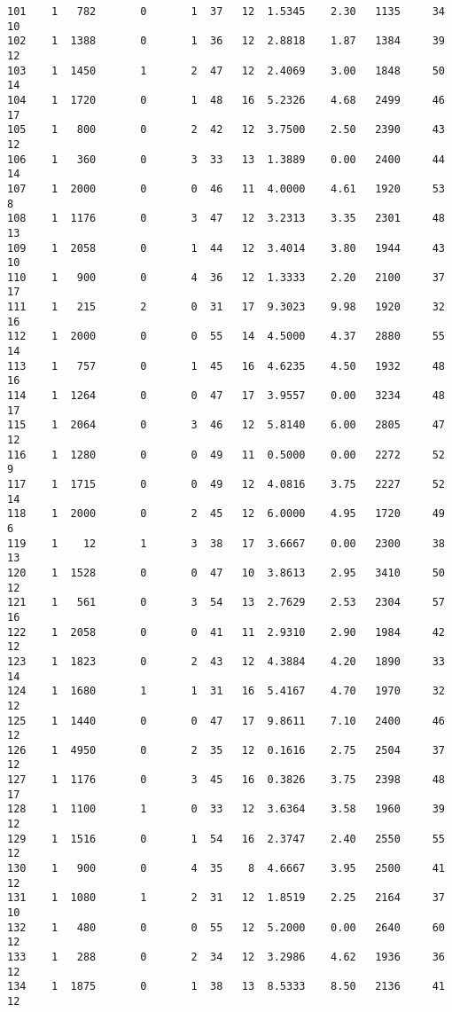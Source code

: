 \documentclass[
  letterpaper,
  DIV=11,
  numbers=noendperiod]{scrreprt}
\begin{document}
\begin{verbatim}
101    1   782       0       1  37   12  1.5345    2.30   1135     34      10
102    1  1388       0       1  36   12  2.8818    1.87   1384     39      12
103    1  1450       1       2  47   12  2.4069    3.00   1848     50      14
104    1  1720       0       1  48   16  5.2326    4.68   2499     46      17
105    1   800       0       2  42   12  3.7500    2.50   2390     43      12
106    1   360       0       3  33   13  1.3889    0.00   2400     44      14
107    1  2000       0       0  46   11  4.0000    4.61   1920     53       8
108    1  1176       0       3  47   12  3.2313    3.35   2301     48      13
109    1  2058       0       1  44   12  3.4014    3.80   1944     43      10
110    1   900       0       4  36   12  1.3333    2.20   2100     37      17
111    1   215       2       0  31   17  9.3023    9.98   1920     32      16
112    1  2000       0       0  55   14  4.5000    4.37   2880     55      14
113    1   757       0       1  45   16  4.6235    4.50   1932     48      16
114    1  1264       0       0  47   17  3.9557    0.00   3234     48      17
115    1  2064       0       3  46   12  5.8140    6.00   2805     47      12
116    1  1280       0       0  49   11  0.5000    0.00   2272     52       9
117    1  1715       0       0  49   12  4.0816    3.75   2227     52      14
118    1  2000       0       2  45   12  6.0000    4.95   1720     49       6
119    1    12       1       3  38   17  3.6667    0.00   2300     38      13
120    1  1528       0       0  47   10  3.8613    2.95   3410     50      12
121    1   561       0       3  54   13  2.7629    2.53   2304     57      16
122    1  2058       0       0  41   11  2.9310    2.90   1984     42      12
123    1  1823       0       2  43   12  4.3884    4.20   1890     33      14
124    1  1680       1       1  31   16  5.4167    4.70   1970     32      12
125    1  1440       0       0  47   17  9.8611    7.10   2400     46      12
126    1  4950       0       2  35   12  0.1616    2.75   2504     37      12
127    1  1176       0       3  45   16  0.3826    3.75   2398     48      17
128    1  1100       1       0  33   12  3.6364    3.58   1960     39      12
129    1  1516       0       1  54   16  2.3747    2.40   2550     55      12
130    1   900       0       4  35    8  4.6667    3.95   2500     41      12
131    1  1080       1       2  31   12  1.8519    2.25   2164     37      10
132    1   480       0       0  55   12  5.2000    0.00   2640     60      12
133    1   288       0       2  34   12  3.2986    4.62   1936     36      12
134    1  1875       0       1  38   13  8.5333    8.50   2136     41      12

\end{verbatim}
\end{document}

